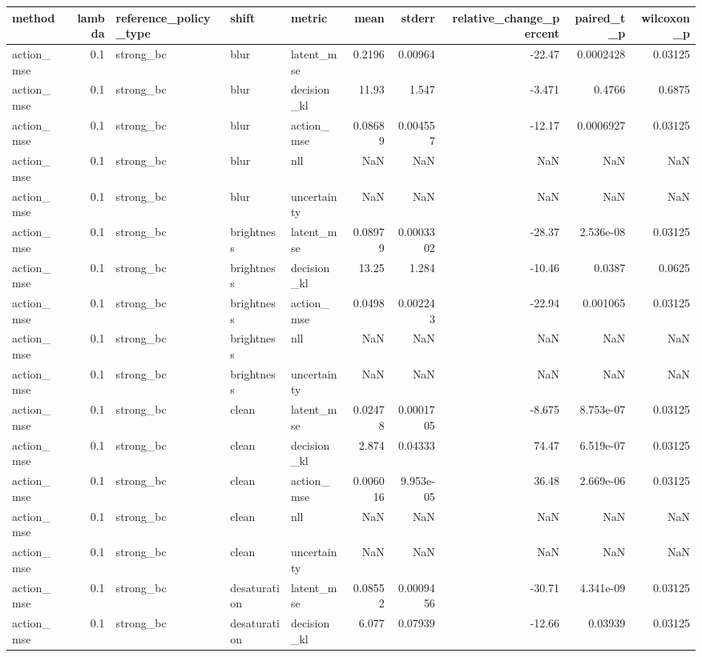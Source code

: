 \begin{tabular}{lrlllrrrrr}
\toprule
method & lambda & reference\_policy\_type & shift & metric & mean & stderr & relative\_change\_percent & paired\_t\_p & wilcoxon\_p \\
\midrule
action\_mse & 0.1 & strong\_bc & blur & latent\_mse & 0.2196 & 0.00964 & -22.47 & 0.0002428 & 0.03125 \\
action\_mse & 0.1 & strong\_bc & blur & decision\_kl & 11.93 & 1.547 & -3.471 & 0.4766 & 0.6875 \\
action\_mse & 0.1 & strong\_bc & blur & action\_mse & 0.08689 & 0.004557 & -12.17 & 0.0006927 & 0.03125 \\
action\_mse & 0.1 & strong\_bc & blur & nll & NaN & NaN & NaN & NaN & NaN \\
action\_mse & 0.1 & strong\_bc & blur & uncertainty & NaN & NaN & NaN & NaN & NaN \\
action\_mse & 0.1 & strong\_bc & brightness & latent\_mse & 0.08979 & 0.0003302 & -28.37 & 2.536e-08 & 0.03125 \\
action\_mse & 0.1 & strong\_bc & brightness & decision\_kl & 13.25 & 1.284 & -10.46 & 0.0387 & 0.0625 \\
action\_mse & 0.1 & strong\_bc & brightness & action\_mse & 0.0498 & 0.002243 & -22.94 & 0.001065 & 0.03125 \\
action\_mse & 0.1 & strong\_bc & brightness & nll & NaN & NaN & NaN & NaN & NaN \\
action\_mse & 0.1 & strong\_bc & brightness & uncertainty & NaN & NaN & NaN & NaN & NaN \\
action\_mse & 0.1 & strong\_bc & clean & latent\_mse & 0.02478 & 0.0001705 & -8.675 & 8.753e-07 & 0.03125 \\
action\_mse & 0.1 & strong\_bc & clean & decision\_kl & 2.874 & 0.04333 & 74.47 & 6.519e-07 & 0.03125 \\
action\_mse & 0.1 & strong\_bc & clean & action\_mse & 0.006016 & 9.953e-05 & 36.48 & 2.669e-06 & 0.03125 \\
action\_mse & 0.1 & strong\_bc & clean & nll & NaN & NaN & NaN & NaN & NaN \\
action\_mse & 0.1 & strong\_bc & clean & uncertainty & NaN & NaN & NaN & NaN & NaN \\
action\_mse & 0.1 & strong\_bc & desaturation & latent\_mse & 0.08552 & 0.0009456 & -30.71 & 4.341e-09 & 0.03125 \\
action\_mse & 0.1 & strong\_bc & desaturation & decision\_kl & 6.077 & 0.07939 & -12.66 & 0.03939 & 0.03125 \\

\end{tabular}
